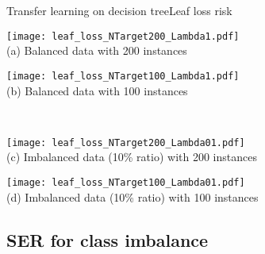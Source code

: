 \begin{frame}{Transfer learning on decision tree}{Leaf loss risk}

\renewcommand{\ratio}{0.78}
\renewcommand{\ratiob}{0.45}
    \centering
    \begin{minipage}[t]{0.8\linewidth}\vspace{0pt}
        \centering
        \begin{minipage}[t]{\ratiob\linewidth}\vspace{0pt}
            \centering
            \texttt{[image: leaf\_loss\_NTarget200\_Lambda1.pdf]}\\
            {\small(a)\; Balanced data with 200 instances}
        \end{minipage}\vspace{0.2cm}
        \begin{minipage}[t]{\ratiob\linewidth}\vspace{0pt}
            \centering
            \texttt{[image: leaf\_loss\_NTarget100\_Lambda1.pdf]}\\
            {\small(b)\; Balanced data with 100 instances }
        \end{minipage}
        \\
        \begin{minipage}[t]{\ratiob\linewidth}\vspace{0pt}
            \centering
            \texttt{[image: leaf\_loss\_NTarget200\_Lambda01.pdf]}\\
            {\small (c)\; Imbalanced data (10\% ratio) with 200 instances}
        \end{minipage}
        \centering
        \begin{minipage}[t]{\ratiob\linewidth}\vspace{0pt}
            \centering
            \texttt{[image: leaf\_loss\_NTarget100\_Lambda01.pdf]}\\
            {\small (d)\; Imbalanced data (10\% ratio) with 100 instances}
        \end{minipage}\vspace{0.1cm}
    \end{minipage}

\end{frame}

\subsection{SER for class imbalance}

